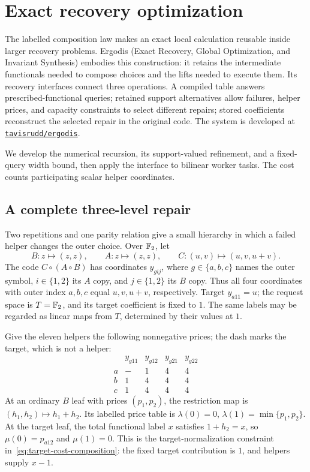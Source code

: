 \section{Exact recovery optimization}
\label{sec:exact-recovery-optimization}

The labelled composition law makes an exact local calculation reusable inside
larger recovery problems.  Ergodis (Exact Recovery, Global Optimization, and
Invariant Synthesis) embodies this construction: it retains the intermediate
functionals needed to compose choices and the lifts needed to execute them.
Its recovery interfaces connect three operations.  A compiled table answers
prescribed-functional queries; retained support alternatives allow failures,
helper prices, and capacity constraints to select different repairs; stored
coefficients reconstruct the selected repair in the original code.
The system is developed at
\href{https://github.com/tavisrudd/ergodis}{\texttt{tavisrudd/ergodis}}.

We develop the numerical recursion, its support-valued refinement, and a
fixed-query width bound, then apply the interface to bilinear worker tasks.
The cost counts participating scalar helper coordinates.



\subsection{A complete three-level repair}
\label{sec:multilevel-example}

Two repetitions and one parity relation give a small hierarchy in which a
failed helper changes the outer choice.  Over $\mathbb F_2$, let
\[
 B:z\longmapsto(z,z),\qquad A:z\longmapsto(z,z),\qquad
 C:(u,v)\longmapsto(u,v,u+v).
\]
The code $C\circ(A\circ B)$ has coordinates $y_{gij}$, where
$g\in\{a,b,c\}$ names the outer symbol, $i\in\{1,2\}$ its $A$ copy,
and $j\in\{1,2\}$ its $B$ copy.  Thus all four coordinates with outer
index $a,b,c$ equal $u,v,u+v$, respectively.  Target $y_{a11}=u$;
the request space is $T=\mathbb F_2$, and its target coefficient is fixed to $1$.
The same labels may be regarded as linear maps from $T$, determined by their
values at $1$.

Give the eleven helpers the following nonnegative prices; the dash marks
the target, which is not a helper:
\[
\begin{array}{c|cc|cc}
 & y_{g11}&y_{g12}&y_{g21}&y_{g22}\\ \hline
 a&-&1&4&4\\
 b&1&4&4&4\\
 c&1&4&4&4
\end{array}
\]
At an ordinary $B$ leaf with prices $(p_1,p_2)$, the restriction map is
$(h_1,h_2)\mapsto h_1+h_2$.  Its labelled price table is
$\lambda(0)=0$, $\lambda(1)=\min\{p_1,p_2\}$.
At the target leaf, the total functional label $x$ satisfies $1+h_2=x$,
so $\mu(0)=p_{a12}$ and $\mu(1)=0$.  This is the target-normalization
constraint in~\eqref{eq:target-cost-composition}: the fixed target contribution
is $1$, and helpers supply $x-1$.

